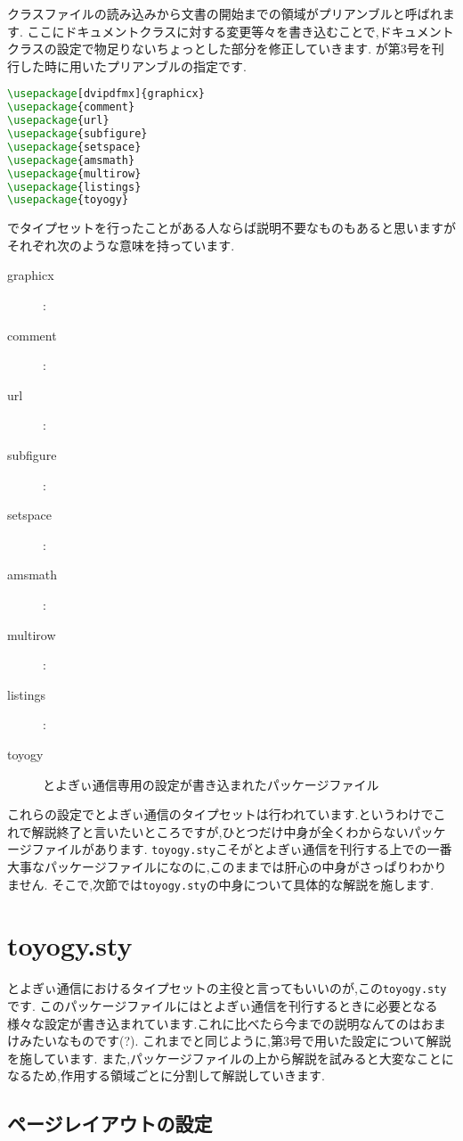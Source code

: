 クラスファイルの読み込みから文書の開始までの領域がプリアンブルと呼ばれます.
ここにドキュメントクラスに対する変更等々を書き込むことで,ドキュメントクラスの設定で物足りないちょっとした部分を修正していきます.
が第3号を刊行した時に用いたプリアンブルの指定です.
\begin{lstlisting}[caption=プリアンブル,label=lis:preamble,language=tex]
\usepackage[dvipdfmx]{graphicx}
\usepackage{comment}
\usepackage{url}
\usepackage{subfigure}
\usepackage{setspace}
\usepackage{amsmath}
\usepackage{multirow}
\usepackage{listings}
\usepackage{toyogy}
\end{lstlisting}
{\LaTeXe}でタイプセットを行ったことがある人ならば説明不要なものもあると思いますがそれぞれ次のような意味を持っています.
\begin{description}
	\item[graphicx] :
	\item[comment] :
	\item[url] :
	\item[subfigure] :
	\item[setspace] :
	\item[amsmath] :
	\item[multirow] :
	\item[listings] :
	\item[toyogy] とよぎぃ通信専用の設定が書き込まれたパッケージファイル
\end{description}

これらの設定でとよぎぃ通信のタイプセットは行われています.というわけでこれで解説終了と言いたいところですが,ひとつだけ中身が全くわからないパッケージファイルがあります.
\texttt{toyogy.sty}こそがとよぎぃ通信を刊行する上での一番大事なパッケージファイルになのに,このままでは肝心の中身がさっぱりわかりません.
そこで,次節では\texttt{toyogy.sty}の中身について具体的な解説を施します.
\section{toyogy.sty}

とよぎぃ通信におけるタイプセットの主役と言ってもいいのが,この\texttt{toyogy.sty}です.
このパッケージファイルにはとよぎぃ通信を刊行するときに必要となる様々な設定が書き込まれています.これに比べたら今までの説明なんてのはおまけみたいなものです(?).
これまでと同じように,第3号で用いた設定について解説を施しています.
また,パッケージファイルの上から解説を試みると大変なことになるため,作用する領域ごとに分割して解説していきます.

\subsection{ページレイアウトの設定}

